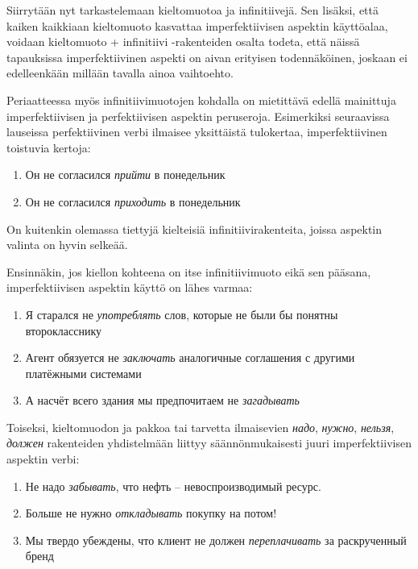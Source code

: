 \documentclass[]{scrreprt}
\providecommand{\tightlist}{%
  \setlength{\itemsep}{0pt}\setlength{\parskip}{0pt}}
\begin{document}
Siirrytään nyt tarkastelemaan kieltomuotoa ja infinitiivejä. Sen
lisäksi, että kaiken kaikkiaan kieltomuoto kasvattaa imperfektiivisen
aspektin käyttöalaa, voidaan kieltomuoto + infinitiivi -rakenteiden
osalta todeta, että näissä tapauksissa imperfektiivinen aspekti on aivan
erityisen todennäköinen, joskaan ei edelleenkään millään tavalla ainoa
vaihtoehto.

Periaatteessa myös infinitiivimuotojen kohdalla on mietittävä edellä
mainittuja imperfektiivisen ja perfektiivisen aspektin peruseroja.
Esimerkiksi seuraavissa lauseissa perfektiivinen verbi ilmaisee
yksittäistä tulokertaa, imperfektiivinen toistuvia kertoja:

\begin{enumerate}
\def\labelenumi{(\arabic{enumi})}
\setcounter{enumi}{322}
\tightlist
\item
  Он не согласился \emph{прийти} в понедельник
\item
  Он не согласился \emph{приходить} в понедельник
\end{enumerate}

On kuitenkin olemassa tiettyjä kielteisiä infinitiivirakenteita, joissa
aspektin valinta on hyvin selkeää.

Ensinnäkin, jos kiellon kohteena on itse infinitiivimuoto eikä sen
pääsana, imperfektiivisen aspektin käyttö on lähes varmaa:

\begin{enumerate}
\def\labelenumi{(\arabic{enumi})}
\setcounter{enumi}{324}
\tightlist
\item
  Я старался не \emph{употреблять} слов, которые не были бы понятны
  второкласснику
\item
  Агент обязуется не \emph{заключать} аналогичные соглашения с другими
  платёжными системами
\item
  А насчёт всего здания мы предпочитаем не \emph{загадывать}
\end{enumerate}

Toiseksi, kieltomuodon ja pakkoa tai tarvetta ilmaisevien \emph{надо},
\emph{нужно}, \emph{нельзя}, \emph{должен} rakenteiden yhdistelmään
liittyy säännönmukaisesti juuri imperfektiivisen aspektin verbi:

\begin{enumerate}
\def\labelenumi{(\arabic{enumi})}
\setcounter{enumi}{327}
\tightlist
\item
  Не надо \emph{забывать}, что нефть -- невоспроизводимый ресурс.
\item
  Больше не нужно \emph{откладывать} покупку на потом!
\item
  Мы твердо убеждены, что клиент не должен \emph{переплачивать} за
  раскрученный бренд
\end{enumerate}
\end{document}
